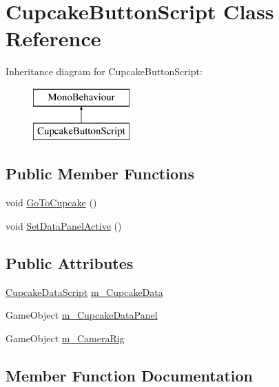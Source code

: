 \hypertarget{class_cupcake_button_script}{}\section{Cupcake\+Button\+Script Class Reference}
\label{class_cupcake_button_script}
Inheritance diagram for Cupcake\+Button\+Script\+:\begin{figure}[H]
\begin{center}
\leavevmode
\includegraphics[height=2.000000cm]{class_cupcake_button_script}
\end{center}
\end{figure}
\subsection*{Public Member Functions}
\begin{DoxyCompactItemize}
\item 
void \mbox{\hyperlink{class_cupcake_button_script_a00c690bffa399c00f293966ef92c936e}{Go\+To\+Cupcake}} ()
\item 
void \mbox{\hyperlink{class_cupcake_button_script_ab42f96c0bc5bd317445b13bbbb61e313}{Set\+Data\+Panel\+Active}} ()
\end{DoxyCompactItemize}
\subsection*{Public Attributes}
\begin{DoxyCompactItemize}
\item 
\mbox{\hyperlink{class_cupcake_data_script}{Cupcake\+Data\+Script}} \mbox{\hyperlink{class_cupcake_button_script_a3541813a737ecda9b79d2e193d9fa114}{m\+\_\+\+Cupcake\+Data}}
\item 
Game\+Object \mbox{\hyperlink{class_cupcake_button_script_a88dc31ad5e0020c230f951d63d78258a}{m\+\_\+\+Cupcake\+Data\+Panel}}
\item 
Game\+Object \mbox{\hyperlink{class_cupcake_button_script_ad2719fc455e2fe2815df3f946109ab57}{m\+\_\+\+Camera\+Rig}}
\end{DoxyCompactItemize}


\subsection{Member Function Documentation}
\mbox{\label{class_cupcake_button_script_a00c690bffa399c00f293966ef92c936e}} 
